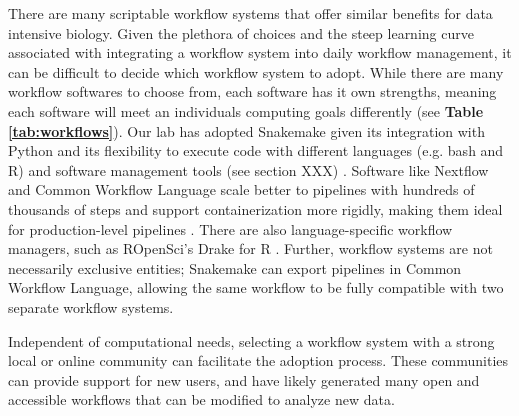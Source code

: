 \documentclass[10pt,letterpaper]{article}
\begin{document}
There are many scriptable workflow systems that offer similar benefits for data intensive biology. 
Given the plethora of choices and the steep learning curve associated with integrating a workflow system into daily workflow management, it can be difficult to decide which workflow system to adopt. 
While there are many workflow softwares to choose from, each software has it own strengths, meaning each software will meet an individuals computing goals differently (see \textbf{Table \ref{tab:workflows}}).
Our lab has adopted Snakemake given its integration with Python and its flexibility to execute code with different languages (e.g. bash and R) and software management tools (see section XXX) \cite{koster2012snakemake}.
Software like Nextflow and Common Workflow Language scale better to pipelines with hundreds of thousands of steps and support containerization more rigidly, making them ideal for production-level pipelines \citep{di2017nextflow, amstutz2016common}. 
There are also language-specific workflow managers, such as ROpenSci's Drake for R \cite{landau2018drake}. 
Further, workflow systems are not necessarily exclusive entities; Snakemake can export pipelines in Common Workflow Language, allowing the same workflow to be fully compatible with two separate workflow systems. 

\begin{table}
\caption{\label{tab:workflows} Popular bioinformatics workflow systems, documentation, and example workflows.}
\end{table}

Independent of computational needs, selecting a workflow system with a strong local or online community can facilitate the adoption process. 
These communities can provide support for new users, and have likely generated many open and accessible workflows that can be modified to analyze new data. 
\end{document}
